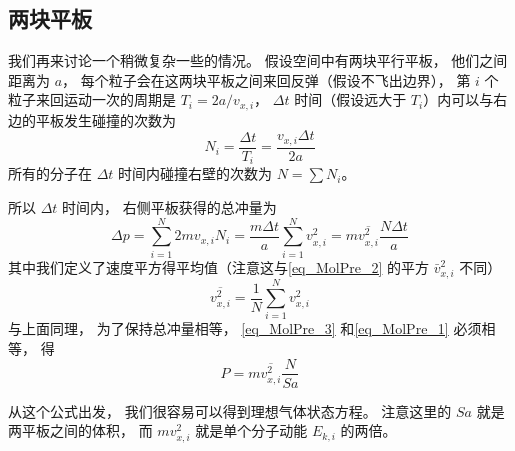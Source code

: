 \subsection{两块平板}
我们再来讨论一个稍微复杂一些的情况。 假设空间中有两块平行平板， 他们之间距离为 $a$， 每个粒子会在这两块平板之间来回反弹（假设不飞出边界）， 第 $i$ 个粒子来回运动一次的周期是 $T_i = 2a/v_{x,i}$， $\Delta t$ 时间（假设远大于 $T_i$）内可以与右边的平板发生碰撞的次数为
\begin{equation}
N_i = \frac{\Delta t}{T_i} = \frac{v_{x,i} \Delta t}{2a}
\end{equation}
所有的分子在 $\Delta t$ 时间内碰撞右壁的次数为 $N = \sum N_i$。

所以 $\Delta t$ 时间内， 右侧平板获得的总冲量为
\begin{equation}\label{eq_MolPre_3}
\Delta p = \sum_{i=1}^N 2mv_{x,i} N_i = \frac{m \Delta t}{a} \sum_{i=1}^N v_{x,i}^2 = m\overline {v_{x,i}^2} \frac{ N\Delta t}{a}
\end{equation}
其中我们定义了速度平方得平均值（注意这与\autoref{eq_MolPre_2} 的平方 $\bar v_{x,i}^2$ 不同）
\begin{equation}
\overline {v_{x,i}^2} = \frac{1}{N} \sum_{i=1}^N v_{x,i}^2
\end{equation}
与上面同理， 为了保持总冲量相等， \autoref{eq_MolPre_3} 和\autoref{eq_MolPre_1} 必须相等， 得
\begin{equation}\label{eq_MolPre_4}
P = m \overline {v_{x,i}^2} \frac{N}{Sa}
\end{equation}

从这个公式出发， 我们很容易可以得到理想气体状态方程。 注意这里的 $Sa$ 就是两平板之间的体积， 而 $mv_{x,i}^2$ 就是单个分子动能 $E_{k,i}$ 的两倍。
